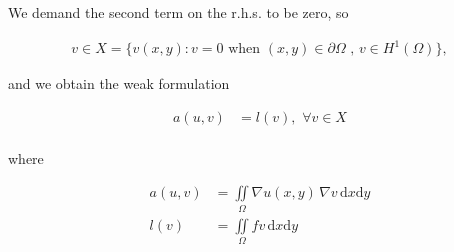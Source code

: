 We demand the second term on the r.h.s. to be zero, so

\begin{align*}
v \in X = \{v(x,y) : v = 0 \textrm{ when } (x,y) \in \partial\Omega\textrm{ , } v \in H^1(\Omega) \},
\end{align*}

and we obtain the weak formulation

\begin{align}
a(u, v) &= l(v) \textrm{, } \, \forall v \in X \\
\end{align}

where

\begin{align}
a(u, v) &= \iint\limits_{\Omega} \nabla u(x,y) \, \nabla v \, \textrm{d}x \textrm{d}y \\
l(v) &= \iint\limits_{\Omega} f v \, \textrm{d}x \textrm{d}y 
\end{align}